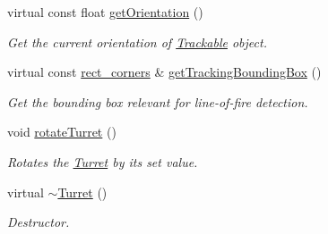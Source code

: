 \begin{DoxyCompactItemize}
virtual const float \hyperlink{classTurret_a7a6d4d2ca7bd5c1c4869298e77e3f1f5}{get\-Orientation} ()
\begin{DoxyCompactList}\small\item\em Get the current orientation of \hyperlink{classTrackable}{Trackable} object. \end{DoxyCompactList}\item 
virtual const \hyperlink{structrect__corners}{rect\-\_\-corners} \& \hyperlink{classTurret_ac39a14672e27fd2399b57386a55b5c04}{get\-Tracking\-Bounding\-Box} ()
\begin{DoxyCompactList}\small\item\em Get the bounding box relevant for line-\/of-\/fire detection. \end{DoxyCompactList}\item 
void \hyperlink{classTurret_a7e66153beba3e6526d1c26be106d7269}{rotate\-Turret} ()
\begin{DoxyCompactList}\small\item\em Rotates the \hyperlink{classTurret}{Turret} by its set value. \end{DoxyCompactList}\item 
virtual \hyperlink{classTurret_add5c91873b2baa27a3aa7a2a4c55e58c}{$\sim$\-Turret} ()
\begin{DoxyCompactList}\small\item\em Destructor. \end{DoxyCompactList}\end{DoxyCompactItemize}
